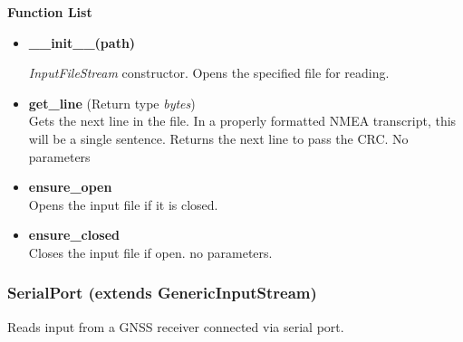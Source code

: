 \textbf{Function List}
\begin{itemize}
	
	\item \textbf{\_\_init\_\_(path)} 

	\emph{InputFileStream} constructor. Opens the specified file for reading.


	\item \textbf{get\_line} (Return type \emph{bytes}) \\
	Gets the next line in the file. In a properly formatted NMEA transcript,
	this will be a single sentence. Returns the next line to pass the CRC. No parameters

	\item \textbf{ensure\_open} \\
	Opens the input file if it is closed.

	\item \textbf{ensure\_closed} \\
	Closes the input file if open. no parameters.

\end{itemize}


\subsubsection{SerialPort (extends GenericInputStream)}

Reads input from a GNSS receiver connected via serial port. \\

